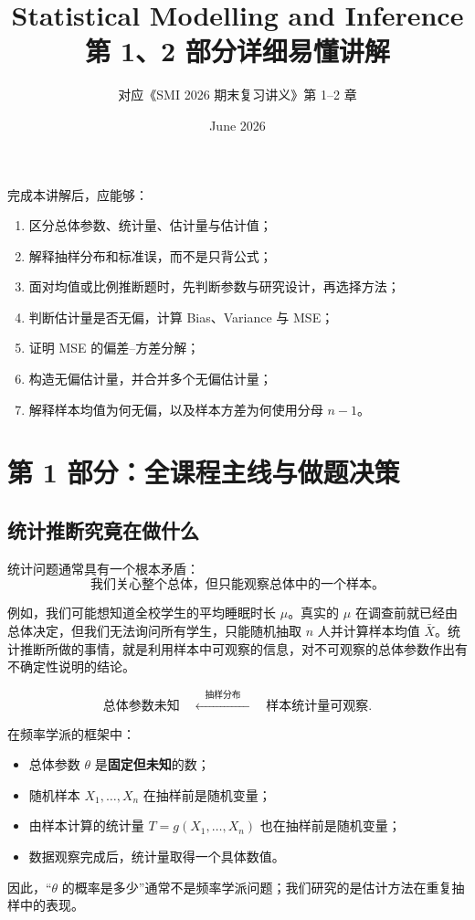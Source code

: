 \documentclass[11pt,a4paper]{article}
\title{\textbf{Statistical Modelling and Inference}\\[0.3em]
第 1、2 部分详细易懂讲解}
\author{对应《SMI 2026 期末复习讲义》第 1--2 章}
\date{June 2026}
\begin{document}
\maketitle

\begin{goalbox}[阅读目标]
完成本讲解后，应能够：
\begin{enumerate}
  \item 区分总体参数、统计量、估计量与估计值；
  \item 解释抽样分布和标准误，而不是只背公式；
  \item 面对均值或比例推断题时，先判断参数与研究设计，再选择方法；
  \item 判断估计量是否无偏，计算 Bias、Variance 与 MSE；
  \item 证明 MSE 的偏差--方差分解；
  \item 构造无偏估计量，并合并多个无偏估计量；
  \item 解释样本均值为何无偏，以及样本方差为何使用分母 $n-1$。
\end{enumerate}
\end{goalbox}

\tableofcontents
\newpage

\section{第 1 部分：全课程主线与做题决策}

\subsection{统计推断究竟在做什么}

统计问题通常具有一个根本矛盾：
\[
  \boxed{\text{我们关心整个总体，但只能观察总体中的一个样本。}}
\]

例如，我们可能想知道全校学生的平均睡眠时长 $\mu$。真实的 $\mu$ 在调查前就已经由总体决定，但我们无法询问所有学生，只能随机抽取 $n$ 人并计算样本均值 $\bar X$。统计推断所做的事情，就是利用样本中可观察的信息，对不可观察的总体参数作出有不确定性说明的结论。

\[
  \boxed{
  \text{总体参数未知}
  \quad \xleftarrow{\quad\text{抽样分布}\quad}\quad
  \text{样本统计量可观察}.
  }
\]

\begin{conceptbox}
在频率学派的框架中：
\begin{itemize}
  \item 总体参数 $\theta$ 是\textbf{固定但未知}的数；
  \item 随机样本 $X_1,\ldots,X_n$ 在抽样前是随机变量；
  \item 由样本计算的统计量 $T=g(X_1,\ldots,X_n)$ 也在抽样前是随机变量；
  \item 数据观察完成后，统计量取得一个具体数值。
\end{itemize}
因此，“$\theta$ 的概率是多少”通常不是频率学派问题；我们研究的是估计方法在重复抽样中的表现。
\end{conceptbox}
\end{document}
